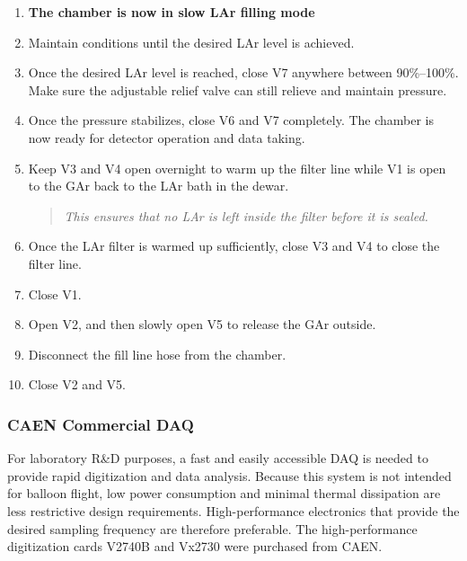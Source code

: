\begin{enumerate}[label=\arabic*.]
    \item \textbf{The chamber is now in slow LAr filling mode}
    
    \item Maintain conditions until the desired LAr level is achieved.
    \item Once the desired LAr level is reached, close V7 anywhere between 90\%--100\%. Make sure the adjustable relief valve can still relieve and maintain pressure.
    \item Once the pressure stabilizes, close V6 and V7 completely. The chamber is now ready for detector operation and data taking.
    \item Keep V3 and V4 open overnight to warm up the filter line while V1 is open to the GAr back to the LAr bath in the dewar.
    \begin{quote}
        \textit{This ensures that no LAr is left inside the filter before it is sealed.}
    \end{quote}
    \item Once the LAr filter is warmed up sufficiently, close V3 and V4 to close the filter line.
    \item Close V1.
    \item Open V2, and then slowly open V5 to release the GAr outside.
    \item Disconnect the fill line hose from the chamber.
    \item Close V2 and V5.
\end{enumerate}

\subsubsection{CAEN Commercial \ac{DAQ}}
\label{chap:GRAMS:pGRAMS:RandD:CAEN}
For laboratory R\&D purposes, a fast and easily accessible \ac{DAQ} is needed to provide rapid digitization and data analysis. Because this system is not intended for balloon flight, low power consumption and minimal thermal dissipation are less restrictive design requirements. High-performance electronics that provide the desired sampling frequency are therefore preferable. The high-performance digitization cards V2740B and Vx2730 were purchased from CAEN.

